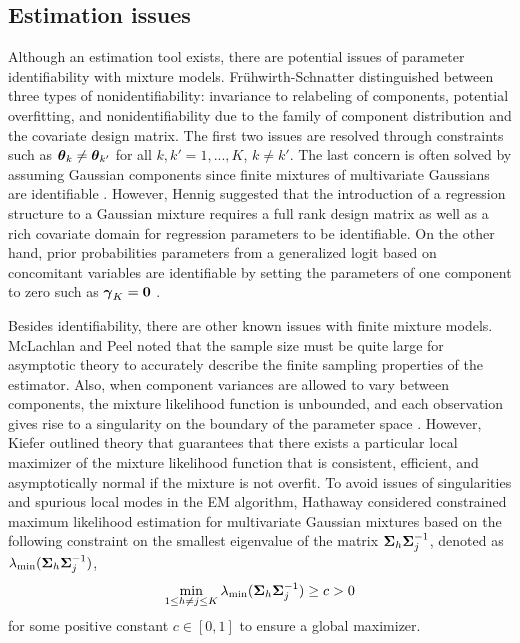 \subsection{Estimation issues}
Although an estimation tool exists, there are potential issues of parameter identifiability with mixture models. Fr{\"u}hwirth-Schnatter \cite{fruhwirth2006} distinguished between three types of nonidentifiability: invariance to  relabeling of components, potential overfitting, and nonidentifiability due to the family of component distribution and the covariate design matrix. The first two issues are resolved through constraints such as $\boldsymbol\theta_{k}\not=\boldsymbol\theta_{k'}$ for all $k,k'=1,...,K$, $k\not=k'$. The last concern is often solved by assuming Gaussian components since finite mixtures of multivariate Gaussians are identifiable \cite{teicher1963,yakowitz1968}. However, Hennig \cite{hennig2000} suggested that the introduction of a regression structure to a Gaussian mixture requires a full rank design matrix as well as a rich covariate domain for regression parameters to be identifiable. On the other hand, prior probabilities parameters from a generalized logit based on concomitant variables are identifiable by setting the parameters of one component to zero such as $\boldsymbol\gamma_{K}=\boldsymbol0$ \cite{jiang1999}.

Besides identifiability, there are other known issues with finite mixture models. McLachlan and Peel \cite{mclachlan2000} noted that the sample size must be quite large for asymptotic theory to accurately describe the finite sampling properties of the estimator. Also, when component variances are allowed to vary between components, the mixture likelihood function is unbounded, and each observation gives rise to a singularity on the boundary of the parameter space \cite{day1969,kiefer1956}. However, Kiefer \cite{kiefer1978} outlined theory that guarantees that there exists a particular local maximizer of the mixture likelihood function that is consistent, efficient, and asymptotically normal if the mixture is not overfit. To avoid issues of singularities and spurious local modes in the EM algorithm, Hathaway \cite{hathaway1985} considered constrained maximum likelihood estimation for multivariate Gaussian mixtures based on the following constraint on the smallest eigenvalue of the matrix $\boldsymbol\Sigma_{h}\boldsymbol\Sigma_{j}^{-1}$, denoted as $\lambda_{\text{min}}(\boldsymbol\Sigma_{h}\boldsymbol\Sigma_{j}^{-1})$,
$$\min_{1\leq h\not=j\leq K}\lambda_{\text{min}}(\boldsymbol\Sigma_{h}\boldsymbol\Sigma_{j}^{-1})\geq c > 0$$ for some positive constant $c\in[0,1]$ to ensure a global maximizer. 



